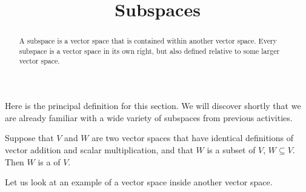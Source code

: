 \documentclass{ximera}
\title{Subspaces}
\begin{document}
\begin{abstract}
  A subspace is a vector space that is contained within another vector
  space.  Every subspace is a vector space in its own right, but also
  defined relative to some larger vector space.
\end{abstract}
\maketitle

Here is the principal definition for this section.  We will discover
shortly that we are already familiar with a wide variety of subspaces
from previous activities.

\begin{definition}[Subspace]
  Suppose that $V$ and $W$ are two vector spaces that have identical
  definitions of vector addition and scalar multiplication, and that
  $W$ is a subset of $V$, $W\subseteq V$.  Then $W$ is a
   of $V$.
\end{definition}

Let us look at an example of a vector space inside another vector space.
\end{document}
